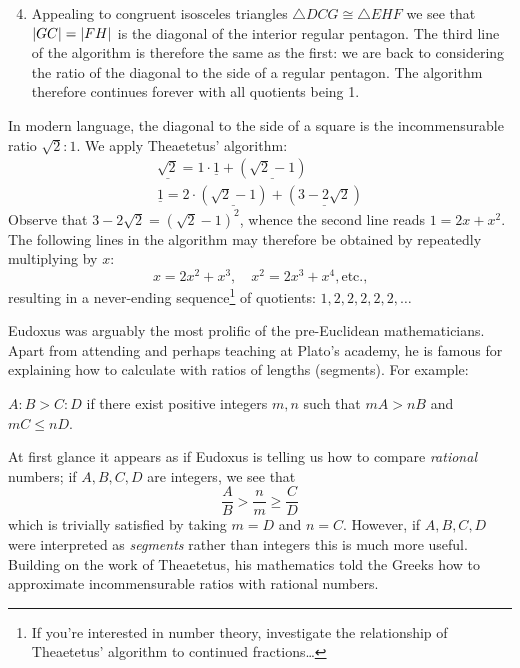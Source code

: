 	
\begin{enumerate}\setcounter{enumi}{3}
	\item Appealing to congruent isosceles triangles $\triangle DCG\cong\triangle EHF$ we see that $\left| GC\right|=\left| FH\right|$ is the diagonal of the interior regular pentagon. The third line of the algorithm is therefore the same as the first: we are back to considering the ratio of the diagonal to the side of a regular pentagon. The algorithm therefore continues forever with all quotients being 1.
\end{enumerate}



In modern language, the diagonal to the side of a square is the incommensurable ratio $\sqrt 2:1$. We apply Theaetetus' algorithm:
\begin{gather*}
	\underline{\sqrt 2}=1\cdot \underline 1+(\underline{\sqrt 2-1})\\
	\underline 1=2\cdot(\underline{\sqrt 2-1})+(\underline{3-2\sqrt 2})
\end{gather*}
Observe that $3-2\sqrt 2=(\sqrt 2-1)^2$, whence the second line reads $1=2x+x^2$. The following lines in the algorithm may therefore be obtained by repeatedly multiplying by $x$:
\[
	x=2x^2+x^3,\quad x^2=2x^3+x^4,\text{etc.,}
\]
resulting in a never-ending sequence\footnote{If you're interested in number theory, investigate the relationship of Theaetetus' algorithm to continued fractions\ldots} of quotients: $1,2,2,2,2,2,\ldots$
	



\label{pg:eudoxus}

Eudoxus was arguably the most prolific of the pre-Euclidean mathematicians. Apart from attending and perhaps teaching at Plato's academy, he is famous for explaining how to calculate with ratios of lengths (segments). For example:

\begin{defn*}{}{}
	$A:B>C:D$ if there exist positive integers $m,n$ such that $mA>nB$ and $mC\le nD$.
\end{defn*}

At first glance it appears as if Eudoxus is telling us how to compare \emph{rational} numbers; if $A,B,C,D$ are integers, we see that
\[
	\frac AB>\frac nm\ge \frac CD
\]
which is trivially satisfied by taking $m=D$ and $n=C$. However, if $A,B,C,D$ were interpreted as \emph{segments} rather than integers this is much more useful. Building on the work of Theaetetus, his mathematics told the Greeks how to approximate incommensurable ratios with rational numbers.



